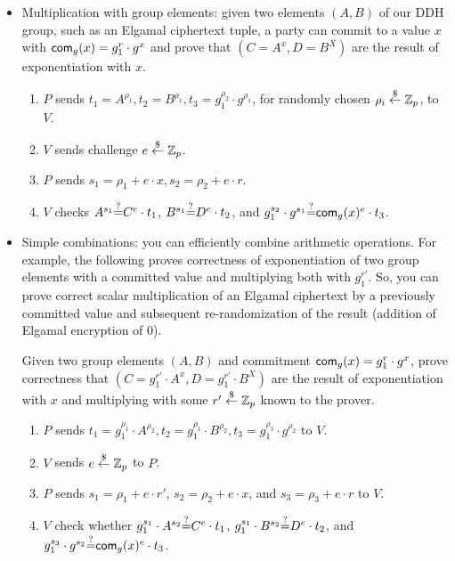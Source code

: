 \documentclass{article}
\begin{document}
\begin{itemize}
  \item Multiplication with group elements: given two elements $(A,B)$
    of our DDH group, such as an Elgamal ciphertext tuple, a party can
    commit to a value $x$ with $\mathsf{com}_g(x) =g_1^r\cdot{}g^x$ and prove
    that $(C=A^x,D=B^X)$ are the result of exponentiation with $x$.
    \begin{enumerate}
      \item $P$ sends $t_1=A^{\rho_1},t_2=B^{\rho_1},
        t_3=g_1^{\rho_2}\cdot{}g^{\rho_1}$, for randomly chosen
        $\rho_i\stackrel{\$}{\leftarrow}\mathbb{Z}_p$, to $V$.

      \item $V$ sends challenge $e\stackrel{\$}{\leftarrow}\mathbb{Z}_p$.

      \item $P$ sends $s_1=\rho_1+e\cdot{}x,s_2=\rho_2+e\cdot{}r$.
        \item $V$ checks $A^{s_1}{\stackrel{?}{=}}{}C^e\cdot{}t_1$,
          $B^{s_1}{\stackrel{?}{=}}{}D^e\cdot{}t_2$, and
          $g_1^{s_2}\cdot{}g^{s_1}{\stackrel{?}{=}}{}\mathsf{com}_g(x)^e\cdot{}t_3$.
          
      \end{enumerate}   

\item Simple combinations: you can efficiently combine arithmetic
  operations. For example, the following proves correctness of
  exponentiation of two group elements with a committed value and
  multiplying both with $g_1^{r'}$. So, you can prove correct scalar
  multiplication of an Elgamal ciphertext by a previously committed
  value and subsequent re-randomization of the result (addition of
  Elgamal encryption of $0$).

Given two group elements $(A,B)$ and commitment $\mathsf{com}_g(x)
=g_1^{r}\cdot{}g^x$, prove correctness that
$(C=g_1^{r'}\cdot{}A^x,D=g_1^{r'}\cdot{}B^X)$ are the result of
exponentiation with $x$ and multiplying with some $r'\stackrel{\$}{\leftarrow}\mathbb{Z}_p$ known
to the prover.

\begin{enumerate}
  \item $P$ sends $t_1=g_1^{\rho_1}\cdot{}A^{\rho_2},t_2=g_1^{\rho_1}\cdot{}B^{\rho_2},t_3=g_1^{\rho_3}\cdot{}g^{\rho_2}$ to $V$.
  \item $V$ sends $e\stackrel{\$}{\leftarrow}\mathbb{Z}_p$ to $P$.
    \item $P$ sends $s_1=\rho_1+e\cdot{}r'$, $s_2=\rho_2+e\cdot{}x$,
      and $s_3=\rho_3+e\cdot{}r$ to $V$.
\item $V$ check whether $g_1^{s_1}\cdot{}A^{s_2}{\stackrel{?}{=}}{}C^e\cdot{}t_1$,
  $g_1^{s_1}\cdot{}B^{s_2}{\stackrel{?}{=}}{}D^e\cdot{}t_2$, and
  $g_1^{s_3}\cdot{}g^{s_2}{\stackrel{?}{=}}{}\mathsf{com}_g(x)^e\cdot{}t_3$.
\end{enumerate}


\end{itemize}
\end{document}
